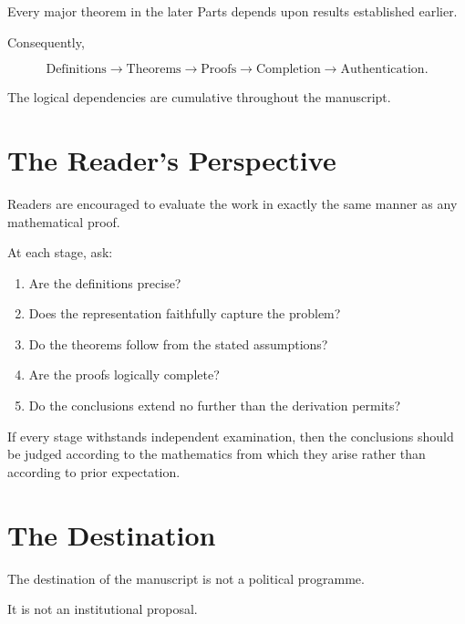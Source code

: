 \documentclass[11pt,openany]{book}
\theoremstyle{plain}
\theoremstyle{definition}
\begin{document}
Every major theorem in the later Parts depends upon results established earlier.

Consequently,

\[
\boxed{
\text{Definitions}
\longrightarrow
\text{Theorems}
\longrightarrow
\text{Proofs}
\longrightarrow
\text{Completion}
\longrightarrow
\text{Authentication}.
}
\]

The logical dependencies are cumulative throughout the manuscript.


\section*{The Reader's Perspective}

Readers are encouraged to evaluate the work in exactly the same manner as any mathematical proof.

At each stage, ask:

\begin{enumerate}

\item Are the definitions precise?

\item Does the representation faithfully capture the problem?

\item Do the theorems follow from the stated assumptions?

\item Are the proofs logically complete?

\item Do the conclusions extend no further than the derivation permits?

\end{enumerate}

If every stage withstands independent examination, then the conclusions should be judged according to the mathematics from which they arise rather than according to prior expectation.


\section*{The Destination}

The destination of the manuscript is not a political programme.

It is not an institutional proposal.
\end{document}
